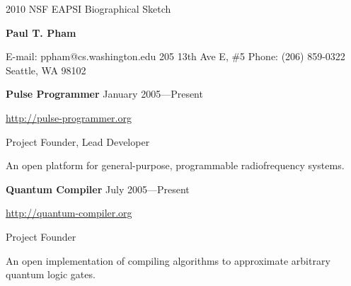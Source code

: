 \documentclass[letter]{article}
\begin{document}
\thispagestyle{empty}           %

\reversemarginpar		%

{\LARGE {2010 NSF EAPSI Biographical Sketch}}
\par
{\Large {\bf Paul T. Pham}}
\par
\vspace{.25in}
E-mail: ppham@cs.washington.edu
\hspace*{\fill}
205 13th Ave E, \#5
\linebreak
Phone: (206) 859-0322
\hspace*{\fill}
Seattle, WA 98102

\par
\vspace{.25in}
				

{\bf Pulse Programmer} \hspace*{\fill}January 2005---Present
\par
\url{http://pulse-programmer.org}
\par
Project Founder, Lead Developer
\par
An open platform for general-purpose, programmable radiofrequency systems.
\vspace{\baselineskip}
\par

{\bf Quantum Compiler} \hspace*{\fill}July 2005---Present
\par
\url{http://quantum-compiler.org}
\par
Project Founder
\par
An open implementation of compiling algorithms to approximate arbitrary quantum
logic gates.
\par
\vspace{\baselineskip}
\par
\end{document}
